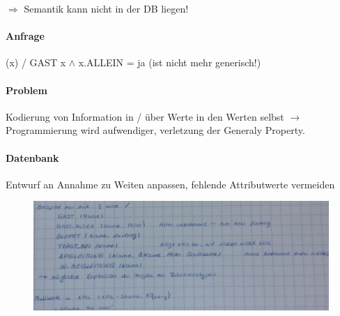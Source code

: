 \documentclass[12pt, a4paper]{article}
\begin{document}
$\Rightarrow$ Semantik kann nicht in der DB liegen!

\paragraph{Anfrage} (x) / GAST x $\wedge$ x.ALLEIN = ja (ist nicht mehr generisch!)
\paragraph{Problem} Kodierung von Information in / über Werte in den Werten selbst $\rightarrow$ Programmierung wird aufwendiger, verletzung der Generaly Property.

\paragraph{Datenbank} Entwurf an Annahme zu Weiten anpassen, fehlende Attributwerte vermeiden

\begin{figure}[h!]
\centering
\includegraphics[width=0.7\linewidth]{img/img30}
\caption{}
\label{fig:img30}
\end{figure}
\end{document}
